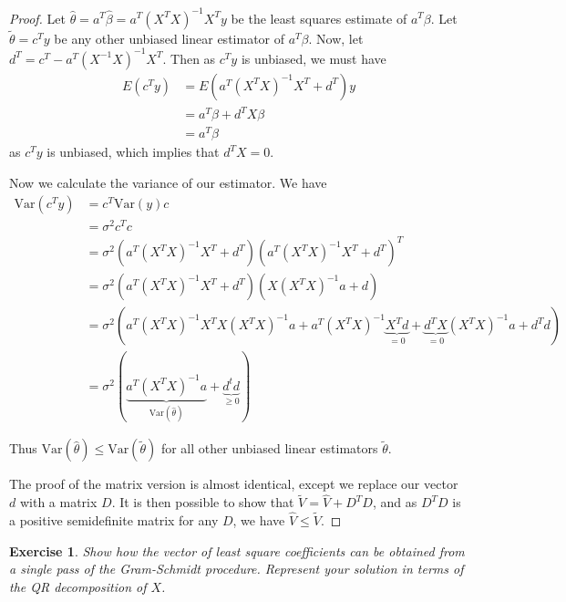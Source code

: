 \documentclass[12pt]{amsart}
\theoremstyle{plain}%
\newtheorem{exer}[thm]{Exercise}
\theoremstyle{definition}
\theoremstyle{remark}
\begin{document}
\begin{proof}
    Let $\hat \theta = a^T \hat \beta = a^T(X^TX)^{-1}X^T y$ be the least squares estimate of $a^T \beta$.  Let $\tilde \theta = c^T y$ be any other unbiased linear estimator of $a^T \beta$.  Now, let $d^T = c^T - a^T(X^{-1}X)^{-1}X^T$.  Then as $c^T y$ is unbiased, we must have \begin{align*}
        E(c^T y) &= E\left( a^T(X^{T}X)^{-1}X^T + d^T\right) y \\
                &= a^T\beta + d^T X\beta \\
                &= a^T\beta
    \end{align*} as $c^T y$ is unbiased, which implies that $d^T X = 0$.

    Now we calculate the variance of our estimator.  We have \begin{align*}
        \text{Var}(c^T y) &= c^T \text{Var}(y) c \\
                    &= \sigma^2 c^T c \\
                    &= \sigma^2 \left( a^T(X^{T}X)^{-1}X^T + d^T \right) \left( a^T (X^T X)^{-1} X^T + d^T \right)^T \\
                    &= \sigma^2 \left( a^T (X^T X)^{-1}X^T + d^T\right) \left(X (X^{T}X)^{-1}a + d\right) \\
                    &= \sigma^2 \left( a^T (X^TX)^{-1}X^T X(X^T X)^{-1} a + a^T (X^T X)^{-1} \underbrace{X^T d}_{=0} + \underbrace{d^T X}_{=0}(X^T X)^{-1} a + d^T d \right) \\
                    &= \sigma^2 \left(\underbrace{a^T (X^T X)^{-1} a}_{\text{Var}(\hat \theta)} + \underbrace{d^t d}_{\geq 0} \right)
    \end{align*}

    Thus $\text{Var}(\hat \theta) \leq \text{Var}(\tilde \theta)$ for all other unbiased linear estimators $\tilde \theta$.

    The proof of the matrix version is almost identical, except we replace our vector $d$ with a matrix $D$.  It is then possible to show that $\tilde V = \hat V + D^T D$, and as $D^T D$ is a positive semidefinite matrix for any $D$, we have $\hat V \leq \tilde V$. 
\end{proof}

\begin{exer}
    Show how the vector of least square coefficients can be obtained from a single pass of the Gram-Schmidt procedure.  Represent your solution in terms of the QR decomposition of $X$.  
\end{exer}
\end{document}
